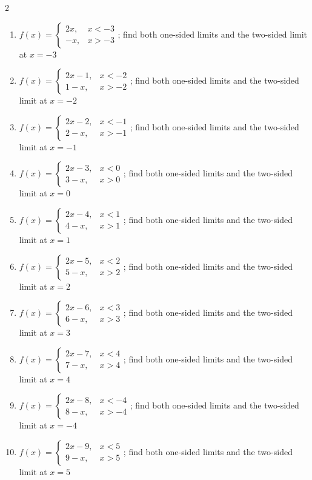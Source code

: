 \documentclass[11pt,oneside]{book}
\begin{document}
\begin{multicols}{2}
\begin{enumerate}[leftmargin=*,label=\textbf{\arabic*.},itemsep=0.65\baselineskip]
\item $f(x)=\begin{cases} 2 x, & x<-3\\ - x, & x>-3 \end{cases}$; find both one-sided limits and the two-sided limit at $x=-3$
\item $f(x)=\begin{cases} 2 x - 1, & x<-2\\ 1 - x, & x>-2 \end{cases}$; find both one-sided limits and the two-sided limit at $x=-2$
\item $f(x)=\begin{cases} 2 x - 2, & x<-1\\ 2 - x, & x>-1 \end{cases}$; find both one-sided limits and the two-sided limit at $x=-1$
\item $f(x)=\begin{cases} 2 x - 3, & x<0\\ 3 - x, & x>0 \end{cases}$; find both one-sided limits and the two-sided limit at $x=0$
\item $f(x)=\begin{cases} 2 x - 4, & x<1\\ 4 - x, & x>1 \end{cases}$; find both one-sided limits and the two-sided limit at $x=1$
\item $f(x)=\begin{cases} 2 x - 5, & x<2\\ 5 - x, & x>2 \end{cases}$; find both one-sided limits and the two-sided limit at $x=2$
\item $f(x)=\begin{cases} 2 x - 6, & x<3\\ 6 - x, & x>3 \end{cases}$; find both one-sided limits and the two-sided limit at $x=3$
\item $f(x)=\begin{cases} 2 x - 7, & x<4\\ 7 - x, & x>4 \end{cases}$; find both one-sided limits and the two-sided limit at $x=4$
\item $f(x)=\begin{cases} 2 x - 8, & x<-4\\ 8 - x, & x>-4 \end{cases}$; find both one-sided limits and the two-sided limit at $x=-4$
\item $f(x)=\begin{cases} 2 x - 9, & x<5\\ 9 - x, & x>5 \end{cases}$; find both one-sided limits and the two-sided limit at $x=5$
\end{enumerate}
\end{multicols}
\end{document}

